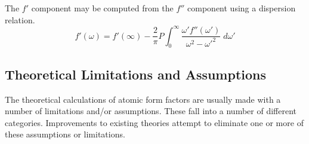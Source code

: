 The $f'$ component may be computed from the $f''$ component using a 
dispersion relation.
\begin{equation}
    f'(\omega) = f'(\infty) - \frac{2}{\pi} P
                 \int_0^\infty 
                 \frac{\omega' f''(\omega')}{\omega^2 - {\omega'}^2} \; d\omega'
\end{equation}

\subsection{Theoretical Limitations and Assumptions}
The theoretical calculations of atomic form factors are usually made with a
number of limitations and/or assumptions. These fall into a number of different
categories. Improvements to existing theories attempt to eliminate one or more
of these assumptions or limitations.

